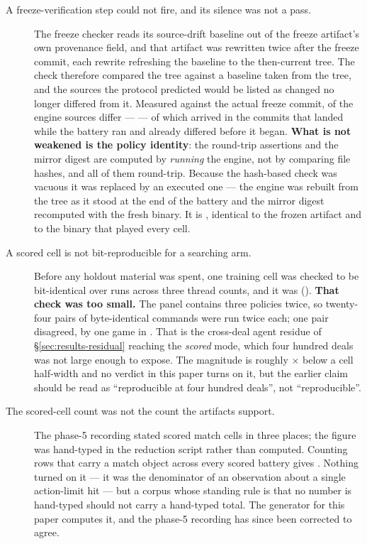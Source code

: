 \begin{description}

\item[A freeze-verification step could not fire, and its silence was not a pass.] The freeze checker reads its source-drift baseline out of the freeze artifact's own
  provenance field, and that artifact was rewritten twice after the freeze commit, each rewrite
  refreshing the baseline to the then-current tree. The check therefore compared the tree against a
  baseline taken from the tree, and the sources the protocol predicted would be listed as changed no
  longer differed from it. Measured against the actual freeze commit, \vsevenDriftChanged{} of the
  \vsevenDriftTotal{} engine sources differ --- \vsevenDriftList{} --- of which
  \vsevenDriftMidBattery{} arrived in the commits that landed while the battery ran and
  \vsevenDriftPreBattery{} already differed before it began. \textbf{What is not weakened is the policy identity}: the round-trip assertions and the
  mirror digest are computed by \emph{running} the engine, not by comparing file hashes, and all of
  them round-trip. Because the hash-based check was vacuous it was replaced by an executed one --- the
  engine was rebuilt from the tree as it stood at the end of the battery and the mirror digest
  recomputed with the fresh binary. It is \texttt{\vsevenMirrorDigest{}}, identical to the frozen
  artifact and to the binary that played every cell.

\item[A scored cell is not bit-reproducible for a searching arm.]
  \label{sec:corrections-reproducibility}
  Before any holdout material was spent, one training cell was checked to be bit-identical over
  \vsevenReproRuns{} runs across three thread counts, and it was
  (\vsevenReproIdentical{}). \textbf{That check was too small.} The panel contains three policies
  twice, so twenty-four pairs of byte-identical commands were run twice each; one pair disagreed, by
  one game in \vsevenResidueGames{}. That is the cross-deal agent residue of \S\ref{sec:results-residual}
  reaching the \emph{scored} mode, which four hundred deals was not large enough to expose. The
  magnitude is roughly \vsevenResidueRatio$\times$ below a cell half-width and no verdict in this paper turns on
  it, but the earlier claim should be read as ``reproducible at four hundred deals'', not
  ``reproducible''.

\item[The scored-cell count was not the count the artifacts support.] The phase-5 recording stated
  \vsevenScoredCellsRecorded{} scored match cells in three places; the figure was hand-typed in the
  reduction script rather than computed. Counting rows that carry a match object across every scored
  battery gives \textbf{\vsevenScoredCells{}}. Nothing turned on it --- it was the denominator of an
  observation about a single action-limit hit --- but a corpus whose standing rule is that no number
  is hand-typed should not carry a hand-typed total. The generator for this paper computes it, and
  the phase-5 recording has since been corrected to agree.


\end{description}
